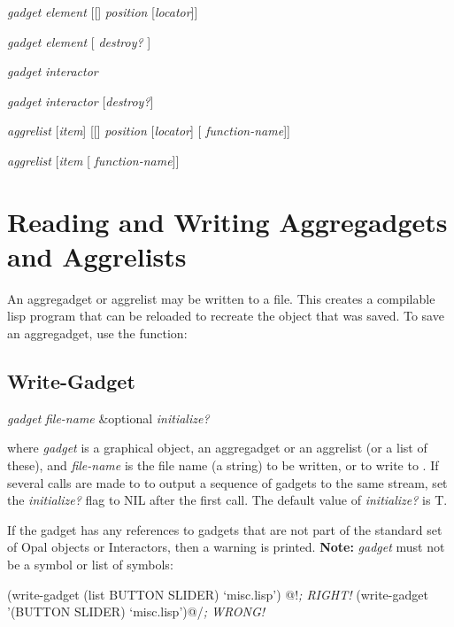  {\it gadget} {\it element} [[] {\it position} [{\it locator}]]\value{method}

 {\it gadget element} [ {\it destroy?} ]\value{Method}

 {\it gadget} {\it interactor}\value{method}

 {\it gadget} {\it interactor} [{\it destroy?}]\value{method}

 {\it aggrelist} [{\it item}] [[] {\it position} [{\it locator}] [ {\it function-name}]] \value{method}

 {\it aggrelist} [{\it item} [ {\it function-name}]] \value{Method}


\section{Reading and Writing Aggregadgets and Aggrelists}
An aggregadget or aggrelist may be written to a file.  This creates
a compilable lisp program that can be reloaded to recreate the object
that was saved.  To save an aggregadget, use the 
function:

\subsection{Write-Gadget}
\label{write-gadget-sec}

\vspace{1 line}
 {\it gadget} {\it file-name} \&optional {\it initialize?}\value{function}

where {\it gadget} is a graphical object, an
aggregadget or an aggrelist (or a list of these), and {\it file-name}
is the file name (a string) to be written, or  to write
to .  If several calls are made to 
to output a sequence of
gadgets to the same stream, set the {\it initialize?} flag
to NIL after the first call.  The default value of {\it initialize?} is T.

If the gadget has any references to
gadgets that are not part of the standard set of Opal objects or
Interactors, then a warning is printed.   {\bf Note:} {\it gadget}
must not be a symbol or list of symbols:
\begin{programexample}
(write-gadget (list BUTTON SLIDER) `misc.lisp')  @!{\it ; RIGHT!}
(write-gadget '(BUTTON SLIDER) `misc.lisp')@/{\it ; WRONG!}
\end{programexample}


